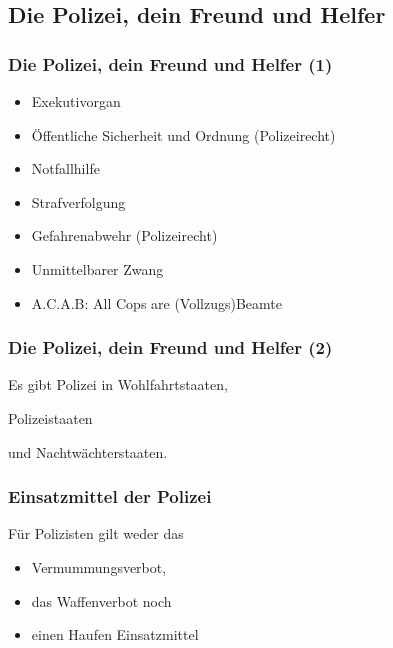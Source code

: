 \documentclass[]{beamer}
\begin{document}
	\begin{frame}
	\subsection{Die Polizei, dein Freund und Helfer}
	\frametitle{Die Polizei, dein Freund und Helfer (1)}
	\begin{itemize}
		\item Exekutivorgan
		\item Öffentliche Sicherheit und Ordnung (Polizeirecht)
		\item Notfallhilfe
		\item Strafverfolgung
		\item Gefahrenabwehr (Polizeirecht)
		\item Unmittelbarer Zwang
		\item A.C.A.B: All Cops are (Vollzugs)Beamte
	\end{itemize}
	\end{frame}

	\begin{frame}
	\frametitle{Die Polizei, dein Freund und Helfer (2)}
	Es gibt Polizei in Wohlfahrtstaaten,\par
	Polizeistaaten\par
	und Nachtwächterstaaten.
	\end{frame}

	\begin{frame}
	\frametitle{Einsatzmittel der Polizei}
	Für Polizisten gilt weder das 
	\begin{itemize}
		\item Vermummungsverbot,
		\item das Waffenverbot noch
		\item einen Haufen Einsatzmittel
	\end{itemize}
	\end{frame}
\end{document}
